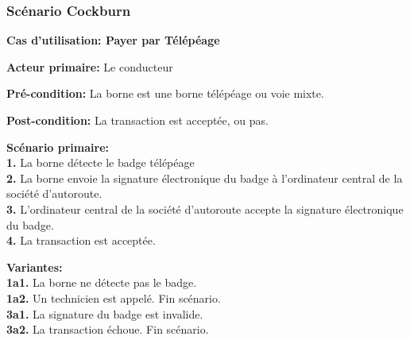 \subsubsection{Scénario Cockburn}
\textbf{Cas d'utilisation: Payer par Télépéage}

\textbf{Acteur primaire:} Le conducteur

\textbf{Pré-condition: }  La borne est une borne télépéage ou voie mixte.
 
\textbf{Post-condition: } La transaction est acceptée, ou pas.

\textbf{Scénario primaire: } \\
    \textbf{1.} La borne détecte le badge télépéage\\
    \textbf{2.} La borne envoie la signature électronique du badge à l’ordinateur central de la société d’autoroute.\\
    \textbf{3.} L’ordinateur central de la société d’autoroute accepte la signature électronique du badge.\\
    \textbf{4.} La transaction est acceptée.

\textbf{Variantes:}\\
    \textbf{1a1.} La borne ne détecte pas le badge. \\
    \textbf{1a2.} Un technicien est appelé. Fin scénario.\\
    \textbf{3a1.} La signature du badge est invalide.\\
    \textbf{3a2.} La transaction échoue. Fin scénario.\\

\newpage
